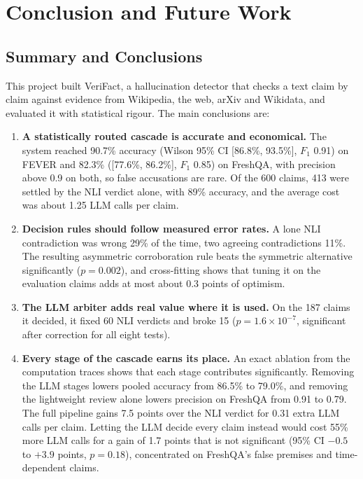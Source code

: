 \chapter{Conclusion and Future Work}
\label{ch:conclusion}

\section{Summary and Conclusions}

This project built VeriFact, a hallucination detector that checks a text claim by claim against evidence from Wikipedia, the web, arXiv and Wikidata, and evaluated it with statistical rigour. The main conclusions are:

\begin{enumerate}[itemsep=0.3em]
  \item \textbf{A statistically routed cascade is accurate and economical.} The system reached 90.7\% accuracy (Wilson 95\% CI [86.8\%, 93.5\%], $F_1$ 0.91) on FEVER and 82.3\% ([77.6\%, 86.2\%], $F_1$ 0.85) on FreshQA, with precision above 0.9 on both, so false accusations are rare. Of the 600 claims, 413 were settled by the NLI verdict alone, with 89\% accuracy, and the average cost was about 1.25 LLM calls per claim.
  \item \textbf{Decision rules should follow measured error rates.} A lone NLI contradiction was wrong 29\% of the time, two agreeing contradictions 11\%. The resulting asymmetric corroboration rule beats the symmetric alternative significantly ($p = 0.002$), and cross-fitting shows that tuning it on the evaluation claims adds at most about 0.3 points of optimism.
  \item \textbf{The LLM arbiter adds real value where it is used.} On the 187 claims it decided, it fixed 60 NLI verdicts and broke 15 ($p = 1.6 \times 10^{-7}$, significant after correction for all eight tests).
  \item \textbf{Every stage of the cascade earns its place.} An exact ablation from the computation traces shows that each stage contributes significantly. Removing the LLM stages lowers pooled accuracy from 86.5\% to 79.0\%, and removing the lightweight review alone lowers precision on FreshQA from 0.91 to 0.79. The full pipeline gains 7.5 points over the NLI verdict for 0.31 extra LLM calls per claim. Letting the LLM decide every claim instead would cost 55\% more LLM calls for a gain of 1.7 points that is not significant (95\% CI $-0.5$ to $+3.9$ points, $p = 0.18$), concentrated on FreshQA's false premises and time-dependent claims.

\end{enumerate}
